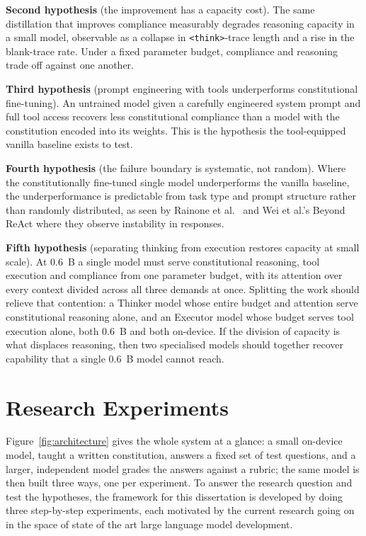 \textbf{Second hypothesis} (the improvement has a capacity cost). The same distillation that improves compliance measurably degrades reasoning capacity in a small model, observable as a collapse in \texttt{<think>}-trace length and a rise in the blank-trace rate. Under a fixed parameter budget, compliance and reasoning trade off against one another.

\textbf{Third hypothesis} (prompt engineering with tools underperforms constitutional fine-tuning). An untrained model given a carefully engineered system prompt and full tool access recovers less constitutional compliance than a model with the constitution encoded into its weights. This is the hypothesis the tool-equipped vanilla baseline exists to test.

\textbf{Fourth hypothesis} (the failure boundary is systematic, not random). Where the constitutionally fine-tuned single model underperforms the vanilla baseline, the underperformance is predictable from task type and prompt structure rather than randomly distributed, as seen by Rainone et al.\ \cite{rainone2025replacingthinkingtoolusage} and Wei et al.'s Beyond ReAct \cite{wei2025reactplannercentricframeworkcomplex} where they observe instability in responses.

\textbf{Fifth hypothesis} (separating thinking from execution restores capacity at small scale). At 0.6~B a single model must serve constitutional reasoning, tool execution and compliance from one parameter budget, with its attention over every context divided across all three demands at once. Splitting the work should relieve that contention: a Thinker model whose entire budget and attention serve constitutional reasoning alone, and an Executor model whose budget serves tool execution alone, both 0.6~B and both on-device. If the division of capacity is what displaces reasoning, then two specialised models should together recover capability that a single 0.6~B model cannot reach.

\section{Research Experiments}
\label{sec:research-experiments}

Figure~\ref{fig:architecture} gives the whole system at a glance: a small on-device model, taught a written constitution, answers a fixed set of test questions, and a larger, independent model grades the answers against a rubric; the same model is then built three ways, one per experiment. To answer the research question and test the hypotheses, the framework for this dissertation is developed by doing three step-by-step experiments, each motivated by the current research going on in the space of state of the art large language model development.

